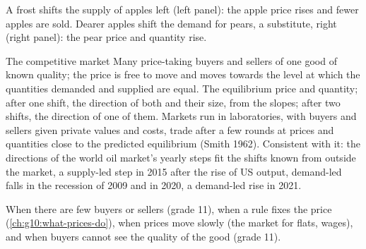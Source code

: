 \begin{omfigure}

{\small A frost shifts the supply of apples left (left panel): the apple price rises and fewer apples are sold. Dearer apples shift the
demand for pears, a substitute, right (right panel): the pear price and quantity rise.}
\end{omfigure}

\begin{model}{The competitive market}
\assumes Many price-taking buyers and sellers of one good of known quality; the price is free to move and moves towards the level at which
  the quantities demanded and supplied are equal.
\predicts The equilibrium price and quantity; after one shift, the direction of both and their size, from the slopes; after two shifts, the
  direction of one of them.
\tested Markets run in laboratories, with buyers and sellers given private values and costs, trade after a few rounds at prices and
  quantities close to the predicted equilibrium (Smith 1962). Consistent with it: the directions of the world oil market's yearly steps fit
  the shifts known from outside the market, a supply-led step in 2015 after the rise of US output, demand-led falls in the recession of 2009
  and in 2020, a demand-led rise in 2021.%

\breaks When there are few buyers or sellers (grade 11), when a rule fixes the price (\cref{ch:g10:what-prices-do}), when prices move
  slowly (the market for flats, wages), and when buyers cannot see the quality of the good (grade 11).
\end{model}

